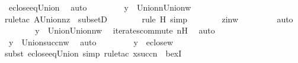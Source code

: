 \begin{isabellebody}
\ eclose{\isacharunderscore}{\kern0pt}eq{\isacharunderscore}{\kern0pt}Union\ \isamarkupfalse%
\ auto\ \isanewline
\ \ \ \ \isamarkupfalse%
\ \isamarkupfalse%
\ {\isachardoublequoteopen}y\ {\isasymin}\ Union{\isacharcircum}{\kern0pt}n{\isacharparenleft}{\kern0pt}Union{\isacharparenleft}{\kern0pt}w{\isacharparenright}{\kern0pt}{\isacharparenright}{\kern0pt}{\isachardoublequoteclose}\ \isanewline
\ \ \ \ \ \ \isamarkupfalse%
{\isacharparenleft}{\kern0pt}rule{\isacharunderscore}{\kern0pt}tac\ A{\isacharequal}{\kern0pt}{\isachardoublequoteopen}Union{\isacharcircum}{\kern0pt}n{\isacharparenleft}{\kern0pt}z{\isacharparenright}{\kern0pt}{\isachardoublequoteclose}\ \ subsetD{\isacharparenright}{\kern0pt}\isanewline
\ \ \ \ \ \ \ \isamarkupfalse%
{\isacharparenleft}{\kern0pt}rule\ H{\isacharcomma}{\kern0pt}\ simp{\isacharparenright}{\kern0pt}\isanewline
\ \ \ \ \ \ \isamarkupfalse%
\ zinw\ \isanewline
\ \ \ \ \ \ \isamarkupfalse%
\ auto\ \isanewline
\ \ \ \ \isamarkupfalse%
\ \isamarkupfalse%
\ {\isachardoublequoteopen}y\ {\isasymin}\ Union{\isacharparenleft}{\kern0pt}Union{\isacharcircum}{\kern0pt}n{\isacharparenleft}{\kern0pt}w{\isacharparenright}{\kern0pt}{\isacharparenright}{\kern0pt}{\isachardoublequoteclose}\ \isamarkupfalse%
\ iterates{\isacharunderscore}{\kern0pt}commute\ nH\ \isamarkupfalse%
\ auto\ \isanewline
\ \ \ \ \isamarkupfalse%
\ \isamarkupfalse%
\ {\isachardoublequoteopen}y\ {\isasymin}\ Union{\isacharcircum}{\kern0pt}{\isacharparenleft}{\kern0pt}succ{\isacharparenleft}{\kern0pt}n{\isacharparenright}{\kern0pt}{\isacharparenright}{\kern0pt}{\isacharparenleft}{\kern0pt}w{\isacharparenright}{\kern0pt}{\isachardoublequoteclose}\ \isamarkupfalse%
\ auto\ \isanewline
\ \ \ \ \isamarkupfalse%
\ \isamarkupfalse%
\ {\isachardoublequoteopen}y\ {\isasymin}\ eclose{\isacharparenleft}{\kern0pt}w{\isacharparenright}{\kern0pt}{\isachardoublequoteclose}\ \isanewline
\ \ \ \ \ \ \isamarkupfalse%
{\isacharparenleft}{\kern0pt}subst\ eclose{\isacharunderscore}{\kern0pt}eq{\isacharunderscore}{\kern0pt}Union{\isacharcomma}{\kern0pt}\ simp{\isacharcomma}{\kern0pt}\ rule{\isacharunderscore}{\kern0pt}tac\ x{\isacharequal}{\kern0pt}{\isachardoublequoteopen}succ{\isacharparenleft}{\kern0pt}n{\isacharparenright}{\kern0pt}{\isachardoublequoteclose}\ \ bexI{\isacharparenright}{\kern0pt}\isanewline

\end{isabellebody}

